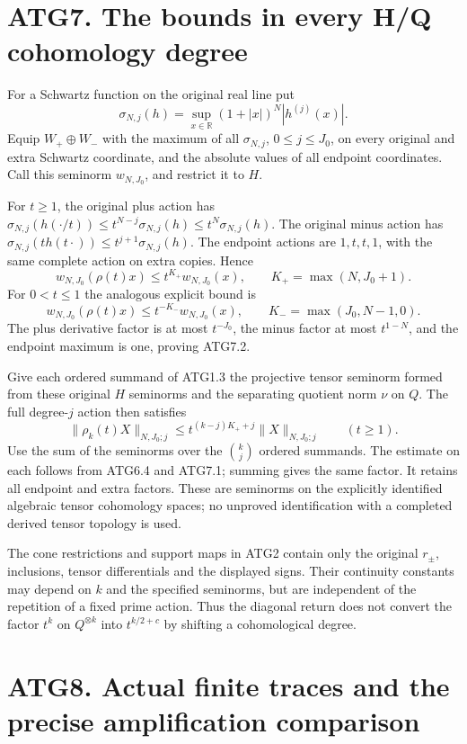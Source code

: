 \section{ATG7. The bounds in every H/Q cohomology
degree}\label{atg7.-the-bounds-in-every-hq-cohomology-degree}

For a Schwartz function on the original real line put \[
\sigma_{N,j}(h)=\sup_{x\in\mathbb R}(1+|x|)^N|h^{(j)}(x)|.
\] Equip \(W_+\oplus W_-\) with the maximum of all \(\sigma_{N,j}\),
\(0\le j\le J_0\), on every original and extra Schwartz coordinate, and
the absolute values of all endpoint coordinates. Call this seminorm
\(w_{N,J_0}\), and restrict it to \(H\).

For \(t\ge1\), the original plus action has
\(\sigma_{N,j}(h(\cdot/t))\le t^{N-j}\sigma_{N,j}(h)\le t^N\sigma_{N,j}(h)\).
The original minus action has
\(\sigma_{N,j}(t h(t\cdot))\le t^{j+1}\sigma_{N,j}(h)\). The endpoint
actions are \(1,t,t,1\), with the same complete action on extra copies.
Hence \[
w_{N,J_0}(\rho(t)x)\le t^{K_+}w_{N,J_0}(x),
\qquad K_+=\max(N,J_0+1).
\tag{ATG7.1}
\] For \(0<t\le1\) the analogous explicit bound is \[
w_{N,J_0}(\rho(t)x)\le t^{-K_-}w_{N,J_0}(x),
\qquad K_-=\max(J_0,N-1,0).
\tag{ATG7.2}
\] The plus derivative factor is at most \(t^{-J_0}\), the minus factor
at most \(t^{1-N}\), and the endpoint maximum is one, proving ATG7.2.

Give each ordered summand of ATG1.3 the projective tensor seminorm
formed from these original \(H\) seminorms and the separating quotient
norm \(\nu\) on \(Q\). The full degree-\(j\) action then satisfies \[
\boxed{\|\rho_k(t)X\|_{N,J_0;j}
 \le t^{(k-j)K_++j}\|X\|_{N,J_0;j}\qquad(t\ge1).}
\tag{ATG7.3}
\] Use the sum of the seminorms over the \(\binom{k}{j}\) ordered
summands. The estimate on each follows from ATG6.4 and ATG7.1; summing
gives the same factor. It retains all endpoint and extra factors. These
are seminorms on the explicitly identified algebraic tensor cohomology
spaces; no unproved identification with a completed derived tensor
topology is used.

The cone restrictions and support maps in ATG2 contain only the original
\(r_\pm\), inclusions, tensor differentials and the displayed signs.
Their continuity constants may depend on \(k\) and the specified
seminorms, but are independent of the repetition of a fixed prime
action. Thus the diagonal return does not convert the factor \(t^k\) on
\(Q^{\otimes k}\) into \(t^{k/2+c}\) by shifting a cohomological degree.

\section{ATG8. Actual finite traces and the precise amplification
comparison}\label{atg8.-actual-finite-traces-and-the-precise-amplification-comparison}


